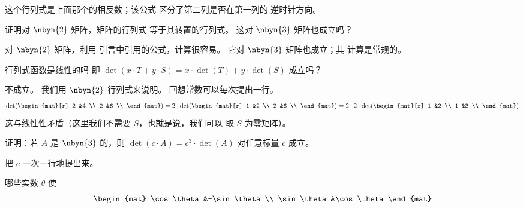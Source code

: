 \begin{exercises}
\begin{answer}
      这个行列式是上面那个的相反数；该公式
      区分了第二列是否在第一列的
      逆时针方向。  
     \end{answer}
  \item 
    证明对 \( \nbyn{2} \) 矩阵，矩阵的行列式
    等于其转置的行列式。
    这对 \( \nbyn{3} \) 矩阵也成立吗？
    \begin{answer}
      对 \( \nbyn{2} \) 矩阵，利用
      引言中引用的公式，计算很容易。
      它对 \( \nbyn{3} \) 矩阵也成立；其
      计算是常规的。  
    \end{answer}
  \item 
    行列式函数是线性的吗 \Dash  即
    \( \det(x\cdot T+y\cdot S)=x\cdot \det(T)+y\cdot \det(S) \) 成立吗？
    \begin{answer}
      不成立。
      我们用 $\nbyn{2}$ 行列式来说明。
      回想常数可以每次提出一行。
      \begin{equation*}
         \det(
         \begin{mat}[r]
            2  &4  \\
            2  &6  \\
         \end{mat})
         =
         2\cdot\det(\begin{mat}[r]
            1  &2  \\
            2  &6  \\
         \end{mat})
         =
         2\cdot 2\cdot \det(\begin{mat}[r]
            1  &2  \\
            1  &3  \\
         \end{mat})
      \end{equation*}
      这与线性性矛盾（这里我们不需要 \( S \)，也就是说，我们可以
      取 $S$ 为零矩阵）。  
    \end{answer}
  \item 
    证明：若 \( A \) 是 \( \nbyn{3} \) 的，则
    \( \det(c\cdot A)=c^3\cdot \det(A) \) 对任意标量 \( c \) 成立。
    \begin{answer}
       把 \( c \) 一次一行地提出来。  
    \end{answer}
  \item 
    哪些实数 \( \theta \) 使
    \begin{equation*}
       \begin{mat}
          \cos\theta  &-\sin\theta  \\
          \sin\theta  &\cos\theta
       \end{mat}

\end{equation*}
\end{exercises}
